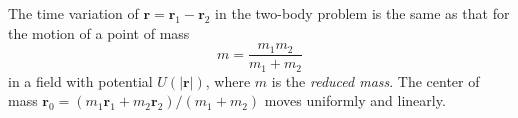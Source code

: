 The time variation of $\mathbf{r} = \mathbf{r}_1 - \mathbf{r}_2$ in the two-body problem is the same as that for the motion of a point of mass
$$m = \frac{m_1 m_2}{m_1 + m_2}$$
in a field with potential $U(|\mathbf{r}|)$, where $m$ is the \textit{reduced mass}. The center of mass $\mathbf{r}_0 = (m_1 \mathbf{r}_1 + m_2 \mathbf{r}_2)/(m_1 + m_2)$ moves uniformly and linearly.
